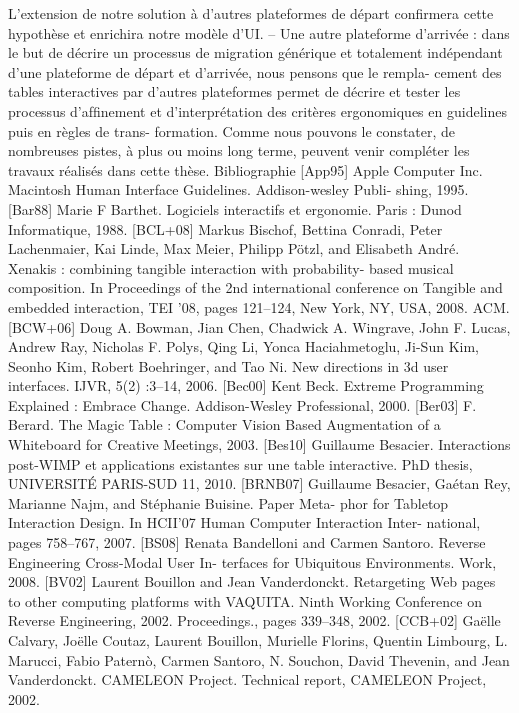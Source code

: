 \documentclass{article}
\begin{document}
L’extension de notre solution à d’autres plateformes de départ conﬁrmera cette hypothèse et
enrichira notre modèle d’UI.
– Une autre plateforme d’arrivée : dans le but de décrire un processus de migration générique
et totalement indépendant d’une plateforme de départ et d’arrivée, nous pensons que le rempla-
cement des tables interactives par d’autres plateformes permet de décrire et tester les processus
d’afﬁnement et d’interprétation des critères ergonomiques en guidelines puis en règles de trans-
formation.
Comme nous pouvons le constater, de nombreuses pistes, à plus ou moins long terme, peuvent
venir compléter les travaux réalisés dans cette thèse.
Bibliographie
[App95]
Apple Computer Inc. Macintosh Human Interface Guidelines. Addison-wesley Publi-
shing, 1995.
[Bar88]
Marie F Barthet. Logiciels interactifs et ergonomie. Paris : Dunod Informatique, 1988.
[BCL+08]
Markus Bischof, Bettina Conradi, Peter Lachenmaier, Kai Linde, Max Meier, Philipp
Pötzl, and Elisabeth André. Xenakis : combining tangible interaction with probability-
based musical composition. In Proceedings of the 2nd international conference on
Tangible and embedded interaction, TEI ’08, pages 121–124, New York, NY, USA,
2008. ACM.
[BCW+06]
Doug A. Bowman, Jian Chen, Chadwick A. Wingrave, John F. Lucas, Andrew Ray,
Nicholas F. Polys, Qing Li, Yonca Haciahmetoglu, Ji-Sun Kim, Seonho Kim, Robert
Boehringer, and Tao Ni. New directions in 3d user interfaces. IJVR, 5(2) :3–14, 2006.
[Bec00]
Kent Beck. Extreme Programming Explained : Embrace Change. Addison-Wesley
Professional, 2000.
[Ber03]
F. Berard. The Magic Table : Computer Vision Based Augmentation of a Whiteboard
for Creative Meetings, 2003.
[Bes10]
Guillaume Besacier. Interactions post-WIMP et applications existantes sur une table
interactive. PhD thesis, UNIVERSITÉ PARIS-SUD 11, 2010.
[BRNB07]
Guillaume Besacier, Gaétan Rey, Marianne Najm, and Stéphanie Buisine. Paper Meta-
phor for Tabletop Interaction Design. In HCII’07 Human Computer Interaction Inter-
national, pages 758–767, 2007.
[BS08]
Renata Bandelloni and Carmen Santoro. Reverse Engineering Cross-Modal User In-
terfaces for Ubiquitous Environments. Work, 2008.
[BV02]
Laurent Bouillon and Jean Vanderdonckt. Retargeting Web pages to other computing
platforms with VAQUITA. Ninth Working Conference on Reverse Engineering, 2002.
Proceedings., pages 339–348, 2002.
[CCB+02]
Gaëlle Calvary, Joëlle Coutaz, Laurent Bouillon, Murielle Florins, Quentin Limbourg,
L. Marucci, Fabio Paternò, Carmen Santoro, N. Souchon, David Thevenin, and Jean
Vanderdonckt. CAMELEON Project. Technical report, CAMELEON Project, 2002.
\end{document}
